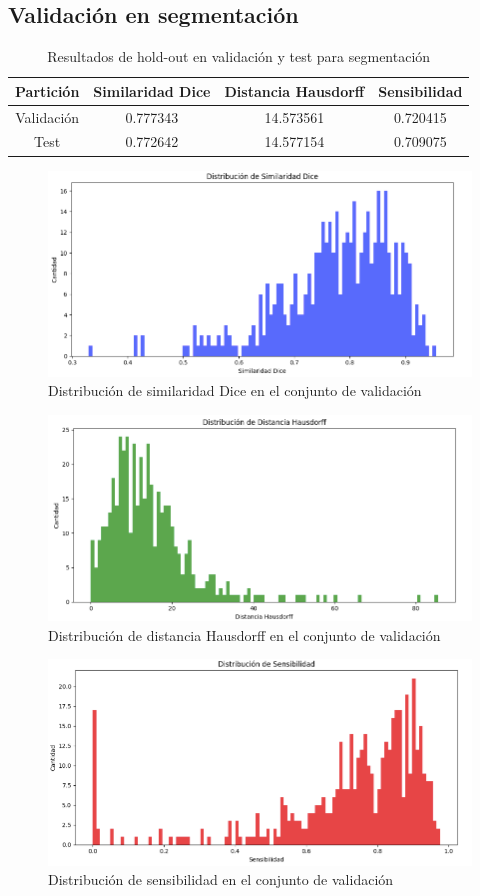 \subsection{Validación en segmentación}

\begin{table}[H]
	\centering
	\begin{tabular}{|cccc|}
		\toprule
		Partición & Similaridad Dice & Distancia Hausdorff & Sensibilidad \\ 
		\midrule
		Validación & 0.777343 & 14.573561 & 0.720415 \\ 
		Test & 0.772642 & 14.577154 & 0.709075 \\ 
		\bottomrule
	\end{tabular}
	\caption{Resultados de hold-out en validación y test para segmentación}
	\label{tabla:resultados5}
\end{table}

\begin{figure}[H]
	\centering
	\includegraphics[width=0.75\linewidth]{imagenes/dist_dice_val.png}
	\caption{Distribución de similaridad Dice en el conjunto de validación}
\end{figure}

\begin{figure}[H]
	\centering
	\includegraphics[width=0.75\linewidth]{imagenes/dist_haus_val.png}
	\caption{Distribución de distancia Hausdorff en el conjunto de validación}
\end{figure}

\begin{figure}[H]
	\centering
	\includegraphics[width=0.75\linewidth]{imagenes/dist_sen_val.png}
	\caption{Distribución de sensibilidad en el conjunto de validación}
\end{figure}

